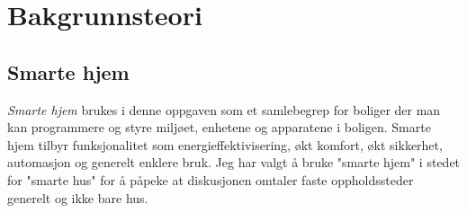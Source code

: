 \section[Bakgrunnsteori]{Bakgrunnsteori}
\subsection{Smarte hjem}
{\color{red}\emph{Smarte hjem} brukes i denne oppgaven som et samlebegrep for boliger der man kan programmere og styre miljøet, enhetene og apparatene i boligen. Smarte hjem tilbyr funksjonalitet som energieffektivisering, økt komfort, økt sikkerhet, automasjon og generelt enklere bruk. Jeg har valgt å bruke "smarte hjem" i stedet for "smarte hus" for å påpeke at diskusjonen omtaler faste oppholdssteder generelt og ikke bare hus. }

